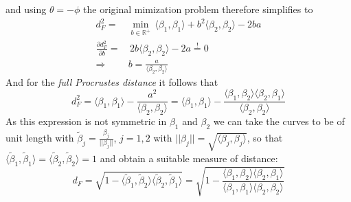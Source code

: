and using $\theta = -\phi$ the original mimization problem therefore simplifies to
\begin{align*}
    d_F^2 =&
    \min_{b \in \mathbb{R}^+}\,
    \langle \beta_1, \beta_1 \rangle
    + b^2 \langle \beta_2, \beta_2 \rangle
    - 2 b a \\
    \frac{\partial d_F^2}{\partial b} =& \,
    2 b \langle \beta_2, \beta_2 \rangle - 2a \stackrel{!}{=} 0 \\
    \Rightarrow \quad & b = \frac{a}{\langle \beta_2, \beta_2 \rangle}
\end{align*}
And for the \textit{full Procrustes distance} it follows that
$$ d_F^2
= \langle \beta_1, \beta_1 \rangle - \frac{a^2}{\langle \beta_2, \beta_2 \rangle}
= \langle \beta_1, \beta_1 \rangle - \frac{ \langle \beta_1, \beta_2 \rangle \langle \beta_2, \beta_1 \rangle}{\langle \beta_2, \beta_2 \rangle}$$
As this expression is not symmetric in $\beta_1$ and $\beta_2$ we can take the curves to be of unit length with $\tilde{\beta}_j = \frac{\beta_j}{||\beta_j||}$, $j=1,2$ with $||\beta_j|| = \sqrt{\langle \beta_j, \beta_j \rangle}$, so that $\langle \tilde\beta_1, \tilde\beta_1 \rangle = \langle \tilde\beta_2, \tilde\beta_2 \rangle = 1$ and obtain a suitable measure of distance:
$$ d_F = \sqrt{1 - \langle \tilde\beta_1, \tilde\beta_2 \rangle
\langle \tilde\beta_2, \tilde\beta_1 \rangle}
= \sqrt{1 - \frac{ \langle \beta_1, \beta_2 \rangle \langle \beta_2, \beta_1 \rangle}{\langle \beta_1, \beta_1 \rangle \langle \beta_2, \beta_2 \rangle}}$$


